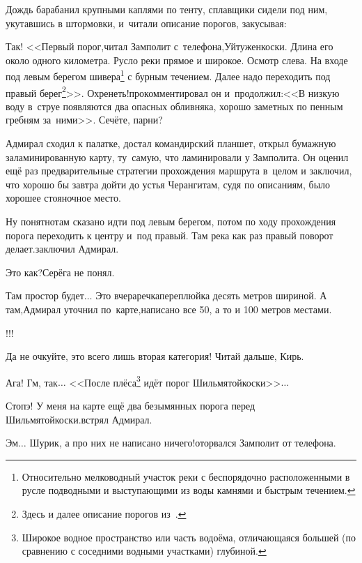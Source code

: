 Дождь барабанил крупными каплями по тенту, сплавщики сидели под ним, укутавшись в штормовки, и~читали описание порогов, закусывая:

\renewcommand*{\thefootnote}{\arabic{footnote}}
\setcounter{footnote}{0}
\diagdash Так! <<Первый порог,\mdash читал Замполит с~телефона,\mdash Уйтуженкоски. Длина его около одного километра. Русло реки прямое и широкое. Осмотр слева. На входе под левым берегом шивера\footnote{Относительно мелководный участок реки с беспорядочно расположенными в русле подводными и выступающими из воды камнями и быстрым течением.} с бурным течением. Далее надо переходить под правый берег\footnote{Здесь и далее описание порогов из~\cite{Шилов}.}>>. Охренеть!\mdash прокомментировал он и~продолжил:\mdash <<В низкую воду в~струе появляются два опасных обливняка, хорошо заметных по пенным гребням за~ними>>. Сечёте, парни?

Адмирал сходил к палатке, достал командирский планшет, открыл бумажную заламинированную карту, ту~самую, что ламинировали у Замполита. Он оценил ещё раз предварительные стратегии прохождения маршрута в~целом и заключил, что хорошо бы завтра дойти до устья Черанги\mdash там, судя по описаниям, было хорошее стояночное место.

\diagdash Ну понятно\mdash там сказано идти под левым берегом, потом по ходу прохождения порога переходить к центру и~под правый. Там река как раз правый поворот делает.\mdash заключил Адмирал.

\diagdash Это как?\mdash Серёга не понял.

\diagdash Там простор будет$\ldots$ Это вчера\mdash речка\sdash переплюйка десять метров шириной. А там,\mdash Адмирал уточнил по~карте,\mdash написано все 50, а то и 100 метров местами.

\diagdash !!!

\diagdash Да не очкуйте, это всего лишь вторая категория! Читай дальше, Кирь.

\renewcommand*{\thefootnote}{\fnsymbol{footnote}}
\setcounter{footnote}{0}
\diagdash Ага! Гм, так$\ldots$ <<После плёса\footnote{Широкое водное пространство или часть водоёма, отличающаяся большей (по сравнению с соседними водными участками) глубиной.} идёт порог Шильмятойкоски>>$\ldots$

\diagdash Стопэ! У меня на карте ещё два безымянных порога перед Шильмятойкоски.\mdash встрял Адмирал.

\diagdash Эм$\ldots$ Шурик, а про них не написано ничего!\mdash оторвался Замполит от телефона.

